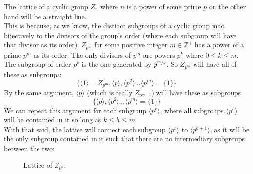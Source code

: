 \documentclass[12pt]{article}
\newcommand{\Z}{\mathbb{Z}}
\newcommand{\ang}[1]{\langle #1 \rangle}
\begin{document}
    The lattice of a cyclic group $Z_n$
    where $n$ is a power of some prime $p$
    on the other hand will be a straight line. \\
    This is because,
    as we know,
    the distinct subgroups of a cyclic group
    mao bijectively to the divisors of the group's order
    (where each subgroup will have that divisor as its order). 
    $Z_{p^m}$ for some positive integer $m \in \Z^+$
    has a power of a prime $p^m$ as its order.
    The only divisors of $p^m$
    are powers $p^k$ where $0 \leqslant k \leqslant m$.
    The subgroup of order $p^k$
    is the one generated by $p^{\sfrac{m}{k}}$.
    So $Z_{p^m}$ will have all of these as subgroups:
    \[ \{ \ang{1} = Z_{p^m}, \ang{p}, \ang{p^2}
    \dots \ang{p^m} = \{1\} \} \]
    By the same argument,
    $\ang{p}$ (which is really $Z_{p^{m-1}}$)
    will have these as subgroups
    \[ \{ \ang{p}, \ang{p^2}
    \dots \ang{p^m} = \{1\} \} \]
    We can repeat this argument for each subgroup $\ang{p^k}$,
    where all subgroups $\ang{p^h}$ 
    will be contained in it so long as $k \leqslant h \leqslant m$. \\
    With that said,
    the lattice will connect
    each subgroup $\ang{p^k}$ to $\ang{p^{k+1}}$,
    as it will be the only subgroup contained in it
    such that there are no intermediary subgroups between the two:
    \begin{figure}[H]
        \centering
    \caption{\label{fig:figure1} Lattice of $Z_{p^n}$.}
    \end{figure} 
\end{document}
